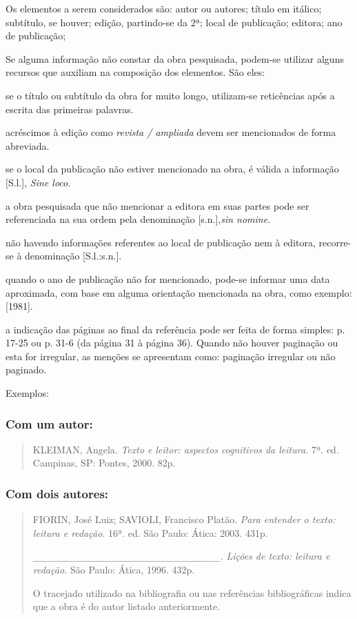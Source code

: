 \documentclass[
	12pt,				%
	openright,			%
	oneside,			%
	a4paper,			%
	english,			%
	french,				%
	spanish,			%
	brazil				%
	]{abntex2}
\begin{document}
\par Os elementos a serem considerados são: autor ou autores; título em itálico; subtítulo, se houver; edição, partindo-se da 2ª; local de publicação; editora; ano de publicação; 
\par Se alguma informação não constar da obra pesquisada, podem-se utilizar alguns recursos que auxiliam na composição dos elementos. São eles:

\begin{alineas}
\item se o título ou subtítulo da obra for muito longo, utilizam-se reticências após a escrita das primeiras palavras.
\item acréscimos à edição como \textit{revista / ampliada} devem ser mencionados de forma abreviada.
\item se o local da publicação não estiver mencionado na obra, é válida a informação [S.l.], \textit{Sine loco}.
\item a obra pesquisada que não mencionar a editora em suas partes pode ser referenciada na sua ordem pela denominação [s.n.],\textit{sin nomine}.
\item não havendo informações referentes ao local de publicação nem à editora, recorre-se à denominação [S.l.:s.n.].
\item quando o ano de publicação não for mencionado, pode-se informar uma data aproximada, com base em alguma orientação mencionada na obra, como exemplo: [1981].
\item a indicação das páginas ao final da referência pode ser feita de forma simples: p. 17-25 ou p. 31-6 (da página 31 à página 36). Quando não houver paginação ou esta for irregular, as menções se apresentam como: paginação irregular ou não paginado.
\end{alineas}

\par Exemplos:

\subsubsection{Com um autor:}
\begin{quote}
\par KLEIMAN, Angela. \textit{Texto e leitor: aspectos cognitivos da leitura.} 7ª. ed. Campinas, SP: Pontes, 2000. 82p.
\end{quote}

\subsubsection{Com dois autores:}
\begin{quote}
\par FIORIN, José Luiz; SAVIOLI, Francisco Platão. \textit{Para entender o texto: leitura e redação}. 16ª. ed. São Paulo: Ática: 2003. 431p.
\par \verb*#______________________________________#. \textit{Lições de texto: leitura e redação.} São Paulo: Ática, 1996. 432p. 
\par O tracejado utilizado na bibliografia ou nas referências bibliográficas indica que a obra é do autor listado anteriormente.
\end{quote}
\end{document}
